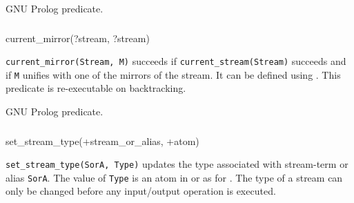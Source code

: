 \Portability

GNU Prolog predicate.

\subsubsection{}

\begin{TemplatesOneCol}
current\_mirror(?stream, ?stream)

\end{TemplatesOneCol}

\Description

\texttt{current\_mirror(Stream, M)} succeeds if
\texttt{current\_stream(Stream)} succeeds  and if
\texttt{M} unifies with one of the mirrors of the stream. It can be
defined using  . This
predicate is re-executable on backtracking.

\begin{PlErrors}



\end{PlErrors}

\Portability

GNU Prolog predicate.

\subsubsection{\label{set-stream-type/2}}

\begin{TemplatesOneCol}
set\_stream\_type(+stream\_or\_alias, +atom)

\end{TemplatesOneCol}

\Description

\texttt{set\_stream\_type(SorA, Type)} updates the type associated with
stream-term or alias \texttt{SorA}. The value of \texttt{Type} is an atom in
 or  as for  .
The type of a stream can only be changed before any input/output operation
is executed.

